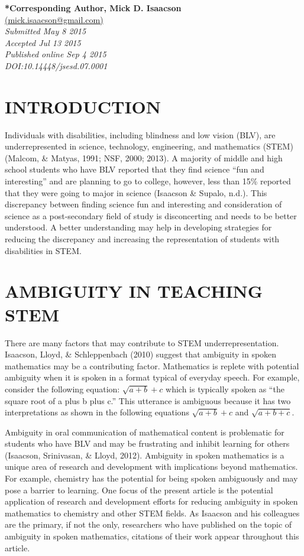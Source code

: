 \documentclass[11.5pt]{sig-alternate} %
\begin{document}
\textbf{*Corresponding Author, Mick D. Isaacson}\\
\href{mailto: mick.isaacson@gmail.com }{(mick.isaacson@gmail.com)} \\
\textit{Submitted May 8 2015 }\\
\textit{Accepted Jul 13 2015} \\
\textit{Published online Sep 4 2015} \\
\textit{DOI:10.14448/jsesd.07.0001} \\
\pagebreak
\clearpage
\begin{large}

\section*{INTRODUCTION}
Individuals with disabilities, including blindness and low vision (BLV), are underrepresented in science, technology, engineering, and mathematics (STEM) (Malcom, \& Matyas, 1991; NSF, 2000; 2013). A majority of middle and high school students who have BLV reported that they find science “fun and interesting” and are planning to go to college, however, less than 15\% reported that they were going to major in science (Isaacson \& Supalo, n.d.). This discrepancy between finding science fun and interesting and consideration of science as a post-secondary field of study is disconcerting and needs to be better understood. A better understanding may help in developing strategies for reducing the discrepancy and increasing the representation of students with disabilities in STEM.

\section*{AMBIGUITY IN TEACHING STEM}

There are many factors that may contribute to STEM underrepresentation. Isaacson, Lloyd, \& Schleppenbach (2010) suggest that ambiguity in spoken mathematics may be a contributing factor. Mathematics is replete with potential ambiguity when it is spoken in a format typical of everyday speech. For example, consider the following equation: $\sqrt{a + b} + c$ which is typically spoken as ``the square root of a plus b plus c.'' This utterance is ambiguous because it has two interpretations as shown in the following equations $\sqrt{a + b} + c$ and $\sqrt{a + b + c}$.

Ambiguity in oral communication of mathematical content is problematic for students who have BLV and may be frustrating and inhibit learning for others (Isaacson, Srinivasan, \& Lloyd, 2012). Ambiguity in spoken mathematics is a unique area of research and development with implications beyond mathematics. For example, chemistry has the potential for being spoken ambiguously and may pose a barrier to learning. One focus of the present article is the potential application of research and development efforts for reducing ambiguity in spoken mathematics to chemistry and other STEM fields. As Isaacson and his colleagues are the primary, if not the only, researchers who have published on the topic of ambiguity in spoken mathematics, citations of their work appear throughout this article.


\end{large}
\end{document}
